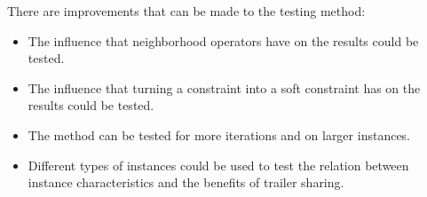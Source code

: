 There are improvements that can be made to the testing method:
\begin{itemize}
\item The influence that neighborhood operators have on the results could be tested.
\item The influence that turning a constraint into a soft constraint has on the results could be tested.
\item The method can be tested for more iterations and on larger instances.
\item Different types of instances could be used to test the relation between instance characteristics and the benefits of trailer sharing.
\end{itemize}




\begin{comment}


\end{comment}
